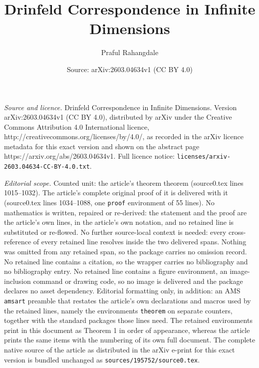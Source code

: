 \documentclass[10pt,a4paper]{amsart}
\title{Drinfeld Correspondence in Infinite Dimensions}
\author{Praful Rahangdale}
\date{Source: arXiv:2603.04634v1 (CC BY 4.0)}
\begin{document}
\maketitle

\noindent\emph{Source and licence.} Drinfeld Correspondence in Infinite Dimensions. Version arXiv:2603.04634v1 (CC BY 4.0), distributed by arXiv under the Creative Commons Attribution 4.0 International licence, http://creativecommons.org/licenses/by/4.0/, as recorded in the arXiv licence metadata for this exact version and shown on the abstract page https://arxiv.org/abs/2603.04634v1. Full licence notice: \texttt{licenses/arxiv-2603.04634-CC-BY-4.0.txt}.\par\smallskip

\noindent\textit{Editorial scope.} Counted unit: the article's theorem theorem (source0.tex lines 1015--1032). The article's complete original proof of it is delivered with it (source0.tex lines 1034--1088, one \texttt{proof} environment of 55 lines). No mathematics is written, repaired or re-derived: the statement and the proof are the article's own lines, in the article's own notation, and no retained line is substituted or re-flowed.  No further source-local context is needed: every cross-reference of every retained line resolves inside the two delivered spans.  Nothing was omitted from any retained span, so the package carries no omission record.  No retained line contains a citation, so the wrapper carries no bibliography and no bibliography entry.  No retained line contains a figure environment, an image-inclusion command or drawing code, so no image is delivered and the package declares no asset dependency.  Editorial formatting only, in addition: an AMS \texttt{amsart} preamble that restates the article's own declarations and macros used by the retained lines, namely the environments \texttt{theorem} on separate counters, together with the standard packages those lines need.  The retained environments print in this document as Theorem 1 in order of appearance, whereas the article prints the same items with the numbering of its own full document.  The complete native source of the article as distributed in the arXiv e-print for this exact version is bundled unchanged as \texttt{sources/195752/source0.tex}.
\end{document}
